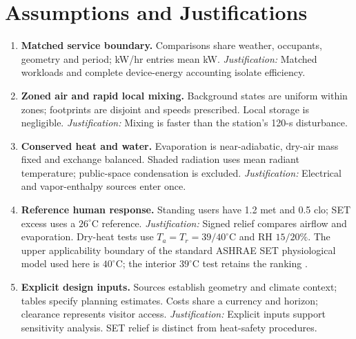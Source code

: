 \section{Assumptions and Justifications}
\begingroup\setlength{\intextsep}{4pt}
\label{sec:assumptions}
\begin{enumerate}[leftmargin=*,itemsep=2pt,topsep=2pt,label=\textbf{A\arabic*.}]
\item \textbf{Matched service boundary.} Comparisons share weather, occupants, geometry and period; kW/hr entries mean kW. \textit{Justification:} Matched workloads and complete device-energy accounting isolate efficiency.
\item \textbf{Zoned air and rapid local mixing.} Background states are uniform within zones; footprints are disjoint and speeds prescribed. Local storage is negligible. \textit{Justification:} Mixing is faster than the station's 120-s disturbance.
\item \textbf{Conserved heat and water.} Evaporation is near-adiabatic, dry-air mass fixed and exchange balanced. Shaded radiation uses mean radiant temperature; public-space condensation is excluded. \textit{Justification:} Electrical and vapor-enthalpy sources enter once.
\item \textbf{Reference human response.} Standing users have 1.2 met and 0.5 clo; SET excess uses a $26^\circ$C reference. \textit{Justification:} Signed relief compares airflow and evaporation. Dry-heat tests use $T_a=T_r=39/40^\circ$C and RH $15/20\%$. The upper applicability boundary of the standard ASHRAE SET physiological model used here is $40^\circ$C; the interior $39^\circ$C test retains the ranking \cite{pythermal}.
\item \textbf{Explicit design inputs.} Sources establish geometry and climate context; tables specify planning estimates. Costs share a currency and horizon; clearance represents visitor access. \textit{Justification:} Explicit inputs support sensitivity analysis. SET relief is distinct from heat-safety procedures.
\end{enumerate}



